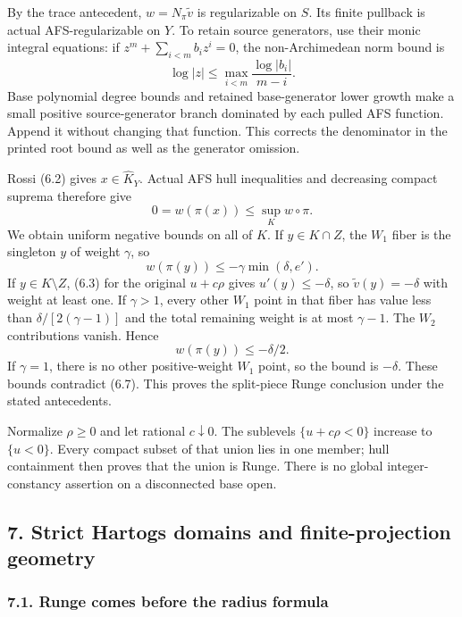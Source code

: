 \documentclass[
  10pt,
]{article}
\begin{document}
By the trace antecedent, \(w=N_\pi\widetilde v\) is regularizable on
\(S\). Its finite pullback is actual AFS-regularizable on \(Y\). To
retain source generators, use their monic integral equations: if
\(z^m+\sum_{i<m}b_i z^i=0\), the non-Archimedean norm bound is
\[\log|z|\le\max_{i<m}\frac{\log|b_i|}{m-i}.\] Base polynomial degree
bounds and retained base-generator lower growth make a small positive
source-generator branch dominated by each pulled AFS function. Append it
without changing that function. This corrects the denominator in the
printed root bound as well as the generator omission.

Rossi (6.2) gives \(x\in\widehat K_Y\). Actual AFS hull inequalities and
decreasing compact suprema therefore give
\[0=w(\pi(x))\le\sup_K w\circ\pi. \tag{6.7}\] We obtain uniform negative
bounds on all of \(K\). If \(y\in K\cap Z\), the \(W_1\) fiber is the
singleton \(y\) of weight \(\gamma\), so
\[w(\pi(y))\le-\gamma\min(\delta,e').\] If \(y\in K\setminus Z\), (6.3)
for the original \(u+c\rho\) gives \(u'(y)\le-\delta\), so
\(\widetilde v(y)=-\delta\) with weight at least one. If \(\gamma>1\),
every other \(W_1\) point in that fiber has value less than
\(\delta/[2(\gamma-1)]\) and the total remaining weight is at most
\(\gamma-1\). The \(W_2\) contributions vanish. Hence
\[w(\pi(y))\le-\delta/2.\] If \(\gamma=1\), there is no other
positive-weight \(W_1\) point, so the bound is \(-\delta\). These bounds
contradict (6.7). This proves the split-piece Runge conclusion under the
stated antecedents.

Normalize \(\rho\ge0\) and let rational \(c\downarrow0\). The sublevels
\(\{u+c\rho<0\}\) increase to \(\{u<0\}\). Every compact subset of that
union lies in one member; hull containment then proves that the union is
Runge. There is no global integer-constancy assertion on a disconnected
base open.

\subsection{7. Strict Hartogs domains and finite-projection
geometry}\label{strict-hartogs-domains-and-finite-projection-geometry}

\subsubsection{7.1. Runge comes before the radius
formula}\label{runge-comes-before-the-radius-formula}
\end{document}
